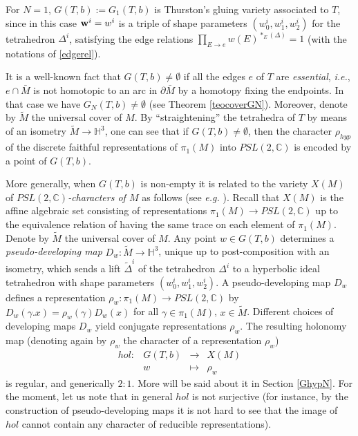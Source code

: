 \documentclass[11pt]{amsart}
\newcommand{\fonc}[5]{                     %
            \begin{array}{lcll}#1 :& #2 & \longrightarrow & #3 \\   %
                         &#4 &\longmapsto & #5          %
            \end{array}}
\newcommand{\mc}{\mathbb{C}}
\newcommand{\mh}{\mathbb{H}}
\newcommand{\bw}{{\bf w}}
\newcommand{\ra}{\rightarrow}
\begin{document}
For $N=1$, $G(T,b):=G_1(T,b)$ is Thurston's gluing variety associated to $T$, since in this case $\bw^i = w^i$ is a triple of shape parameters $(w_0^i,w_1^i,w_2^i)$ for the tetrahedron $\Delta^i$, satisfying the edge relations $\textstyle \prod_{E\ra e} w(E)^{*_E(\Delta)} =  1$ (with the notations of \eqref{edgerel}). 
\smallskip

It is a well-known fact that $G(T,b)\ne \emptyset$ if all the edges $e$ of $T$ are {\it essential}, {\it i.e.}, $e\cap \bar{M}$ is not homotopic to an arc in $\partial \bar{M}$ by a homotopy fixing the endpoints. In that case we have $G_N(T,b)\ne \emptyset$ (see Theorem \ref{teocoverGN}). Moreover, denote by $\tilde M$ the universal cover of $M$. By ``straightening'' the tetrahedra of $T$ by means of an isometry $\tilde M\ra \mh^3$, one can see that if $G(T,b)\ne \emptyset$, then the character $\rho_{hyp}$ of the discrete faithful representations of $\pi_1(M)$ into $PSL(2,\mc)$ is encoded by a point of $G(T,b)$. 

More generally, when $G(T,b)$ is non-empty it is related to the variety $X(M)$ of {\it $PSL(2,\mc)$-characters of $M$} as follows (see {\it e.g.} \cite{NZ,BP,Martelli}). Recall that $X(M)$ is the affine algebraic set consisting of representations $\pi_1(M)\ra PSL(2,\mc)$ up to the equivalence relation of having the same trace on each element of $\pi_1(M)$. Denote by $\tilde M$ the universal cover of $M$. Any point $w\in G(T,b)$  determines a {\it pseudo-developing map} $D_w\colon \tilde{M} \ra \mh^3$, unique up to post-composition with an isometry, which sends a lift $\tilde{\Delta}^i$ of the tetrahedron $\Delta^i$ to a hyperbolic ideal tetrahedron with shape parameters $(w_0^i,w_1^i,w_2^i)$. A pseudo-developing map $D_w$ defines a representation $\rho_w\colon \pi_1(M) \to PSL(2,\mc)$ by $D_w(\gamma.x) = \rho_w(\gamma)D_w(x)$ for all $\gamma\in \pi_1(M)$, $x\in \tilde{M}$. Different choices of developing maps $D_w$ yield conjugate representations $\rho_w$. The resulting holonomy map (denoting again by $\rho_w$ the character of a representation $\rho_w$)
\begin{equation}\label{defholmapSept24}\fonc{hol}{G(T,b)}{X(M)}{w}{\rho_w}
\end{equation} is regular, and generically $2:1$. More will be said about it in Section \ref{GhypN}. For the moment, let us note that in general $hol$ is not surjective (for instance, by the construction of pseudo-developing maps it is not hard to see that the image of $hol$ cannot contain any character of reducible representations). 
\smallskip
\end{document}
